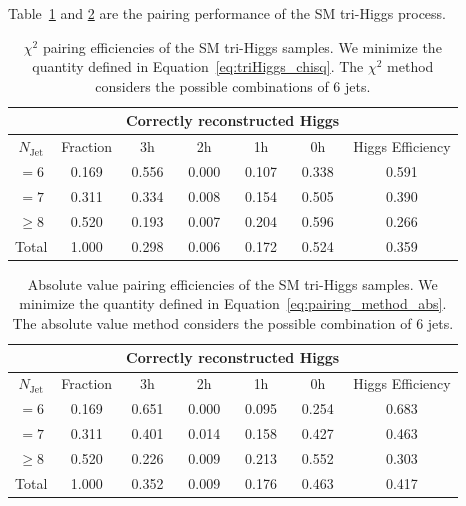 \documentclass[12pt]{article}
\begin{document}
    Table~\ref{tab:chi2_pairing_triHiggs_3h_sm} and \ref{tab:abs_pairing_triHiggs_3h_sm} are the pairing performance of the SM tri-Higgs process.
    \begin{table}[htpb]
        \centering
        \caption{$\chi^2$ pairing efficiencies of the SM tri-Higgs samples. We minimize the quantity defined in Equation~\ref{eq:triHiggs_chisq}. The $\chi^2$ method considers the possible combinations of 6 jets.}
        \label{tab:chi2_pairing_triHiggs_3h_sm}
        \begin{tabular}{c|c|cccc|c}
        \multicolumn{1}{l|}{} &          & \multicolumn{4}{c|}{Correctly reconstructed Higgs} & \multicolumn{1}{l}{} \\ \hline
        $N_\text{Jet}$        & Fraction & 3h          & 2h         & 1h         & 0h         & Higgs Efficiency     \\ \hline
        $=6$                  & 0.169 & 0.556 & 0.000 & 0.107 & 0.338 & 0.591 \\
        $=7$                  & 0.311 & 0.334 & 0.008 & 0.154 & 0.505 & 0.390 \\
        $\ge 8$               & 0.520 & 0.193 & 0.007 & 0.204 & 0.596 & 0.266 \\ \hline
        Total                 & 1.000 & 0.298 & 0.006 & 0.172 & 0.524 & 0.359
        \end{tabular}
    \end{table}
    \begin{table}[htpb]
        \centering
        \caption{Absolute value pairing efficiencies of the SM tri-Higgs samples. We minimize the quantity defined in Equation~\ref{eq:pairing_method_abs}. The absolute value method considers the possible combination of 6 jets.}
        \label{tab:abs_pairing_triHiggs_3h_sm}
        \begin{tabular}{c|c|cccc|c}
        \multicolumn{1}{l|}{} &          & \multicolumn{4}{c|}{Correctly reconstructed Higgs} & \multicolumn{1}{l}{} \\ \hline
        $N_\text{Jet}$        & Fraction & 3h          & 2h         & 1h         & 0h         & Higgs Efficiency     \\ \hline
        $=6$                  & 0.169 & 0.651 & 0.000 & 0.095 & 0.254 & 0.683 \\
        $=7$                  & 0.311 & 0.401 & 0.014 & 0.158 & 0.427 & 0.463 \\
        $\ge 8$               & 0.520 & 0.226 & 0.009 & 0.213 & 0.552 & 0.303 \\ \hline
        Total                 & 1.000 & 0.352 & 0.009 & 0.176 & 0.463 & 0.417
        \end{tabular}
    \end{table}
\end{document}
